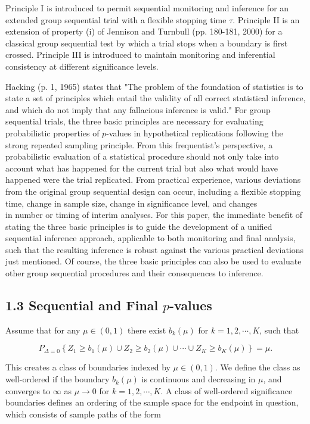 \documentclass[10pt]{article}
\begin{document}
Principle I is introduced to permit sequential monitoring and inference for an extended group sequential trial with a flexible stopping time $\tau$. Principle II is an extension of property (i) of Jennison and Turnbull (pp. 180-181, 2000) for a classical group sequential test by which a trial stops when a boundary is first crossed. Principle III is introduced to maintain monitoring and inferential consistency at different significance levels.

Hacking (p. 1, 1965) states that "The problem of the foundation of statistics is to state a set of principles which entail the validity of all correct statistical inference, and which do not imply that any fallacious inference is valid." For group sequential trials, the three basic principles are necessary for evaluating probabilistic properties of $p$-values in hypothetical replications following the strong repeated sampling principle. From this frequentist's perspective, a probabilistic evaluation of a statistical procedure should not only take into account what has happened for the current trial but also what would have happened were the trial replicated. From practical experience, various deviations from the original group sequential design can occur, including a flexible stopping time, change in sample size, change in significance level, and changes\\
in number or timing of interim analyses. For this paper, the immediate benefit of stating the three basic principles is to guide the development of a unified sequential inference approach, applicable to both monitoring and final analysis, such that the resulting inference is robust against the various practical deviations just mentioned. Of course, the three basic principles can also be used to evaluate other group sequential procedures and their consequences to inference.

\subsection*{1.3 Sequential and Final $p$-values}
Assume that for any $\mu \in(0,1)$ there exist $b_{k}(\mu)$ for $k=1,2, \cdots, K$, such that


\begin{equation*}
P_{\Delta=0}\left\{Z_{1} \geq b_{1}(\mu) \cup Z_{2} \geq b_{2}(\mu) \cup \cdots \cup Z_{K} \geq b_{K}(\mu)\right\}=\mu . \tag{4}
\end{equation*}


This creates a class of boundaries indexed by $\mu \in(0,1)$. We define the class as well-ordered if the boundary $b_{k}(\mu)$ is continuous and decreasing in $\mu$, and converges to $\infty$ as $\mu \rightarrow 0$ for $k=1,2, \cdots, K$. A class of well-ordered significance boundaries defines an ordering of the sample space for the endpoint in question, which consists of sample paths of the form
\end{document}
